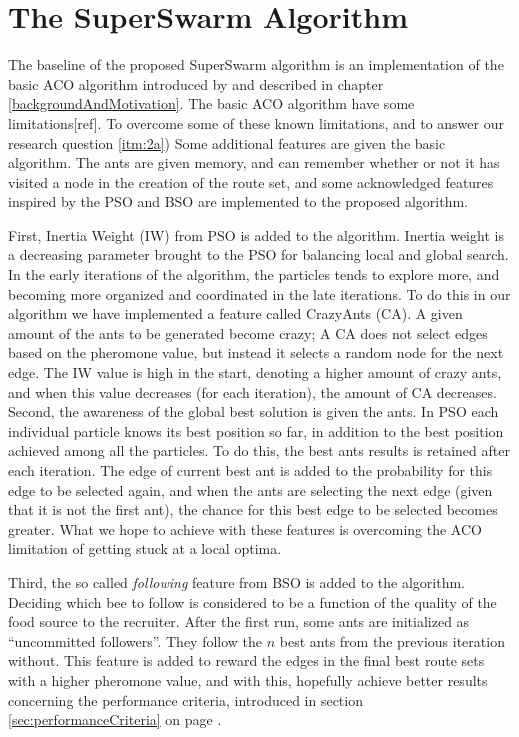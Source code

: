 \section{The SuperSwarm Algorithm}

The baseline of the proposed SuperSwarm algorithm is an implementation of the basic ACO algorithm introduced by \citet{nanda11} and described in chapter \ref{backgroundAndMotivation}. The basic ACO algorithm have some limitations[ref]. To overcome some of these known limitations, and to answer our research question \ref{itm:2a}) %
Some additional features are given the basic algorithm. The ants are given memory, and can remember whether or not it has visited a node in the creation of the route set, and some acknowledged features inspired by the PSO and BSO are implemented to the proposed algorithm.

First, Inertia Weight (IW) from PSO is added to the algorithm. Inertia weight is a decreasing parameter brought to the PSO for balancing local and global search. In the early iterations of the algorithm, the particles tends to explore more, and becoming more organized and coordinated in the late iterations.  To do this in our algorithm we have implemented a feature called CrazyAnts (CA). A given amount of the ants to be generated become crazy; A CA does not select edges based on the pheromone value, but instead it selects a random node for the next edge. The IW value is high in the start, denoting a higher amount of crazy ants, and when this value decreases (for each iteration), the amount of CA decreases. Second, the awareness of the global best solution is given the ants. In PSO each individual particle knows its best position so far, in addition to the best position achieved among all the particles. To do this, the best ants results is retained after each iteration. The edge of current best ant is added to the probability for this edge to be selected again, and when the ants are selecting the next edge (given that it is not the first ant), the chance for this best edge to be selected becomes greater. What we hope to achieve with these features is overcoming the ACO limitation of getting stuck at a local optima.

Third, the so called \textit{following} feature from BSO is added to the algorithm. Deciding which bee to follow is considered to be a function of the quality of the food source to the recruiter. After the first run, some ants are initialized as ``uncommitted followers''. They follow the $n$ best ants from the previous iteration without. This feature is added to reward the edges in the final best route sets with a higher pheromone value, and with this, hopefully achieve better results concerning the performance criteria, introduced in section \ref{sec:performanceCriteria} on page \pageref{sec:performanceCriteria}. 


